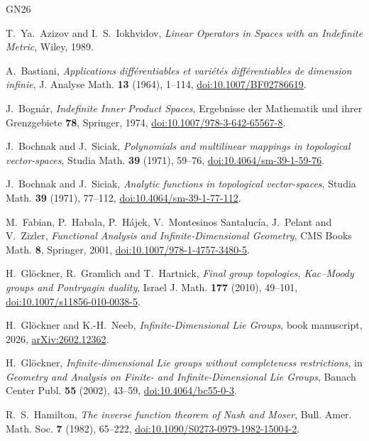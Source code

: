 \begin{thebibliography}{GN26}

T.~Ya.~Azizov and I.~S.~Iokhvidov, \emph{Linear Operators in Spaces with an Indefinite Metric},
Wiley, 1989.

A.~Bastiani, \emph{Applications différentiables et variétés différentiables de dimension
infinie}, J. Analyse Math. \textbf{13} (1964), 1--114, \href{https://doi.org/10.1007/BF02786619}{doi:10.1007/BF02786619}.

J.~Bognár, \emph{Indefinite Inner Product Spaces}, Ergebnisse der Mathematik und ihrer
Grenzgebiete \textbf{78}, Springer, 1974, \href{https://doi.org/10.1007/978-3-642-65567-8}{doi:10.1007/978-3-642-65567-8}.

J.~Bochnak and J.~Siciak, \emph{Polynomials and multilinear mappings in topological
vector-spaces}, Studia Math. \textbf{39} (1971), 59--76, \href{https://doi.org/10.4064/sm-39-1-59-76}{doi:10.4064/sm-39-1-59-76}.

J.~Bochnak and J.~Siciak, \emph{Analytic functions in topological vector-spaces}, Studia Math.
\textbf{39} (1971), 77--112, \href{https://doi.org/10.4064/sm-39-1-77-112}{doi:10.4064/sm-39-1-77-112}.

M.~Fabian, P.~Habala, P.~Hájek, V.~Montesinos Santalucía, J.~Pelant and V.~Zizler,
\emph{Functional Analysis and Infinite-Dimensional Geometry}, CMS Books Math. \textbf{8},
Springer, 2001, \href{https://doi.org/10.1007/978-1-4757-3480-5}{doi:10.1007/978-1-4757-3480-5}.

H.~Glöckner, R.~Gramlich and T.~Hartnick, \emph{Final group topologies, Kac--Moody groups and
Pontryagin duality}, Israel J. Math. \textbf{177} (2010), 49--101, \href{https://doi.org/10.1007/s11856-010-0038-5}{doi:10.1007/s11856-010-0038-5}.

H.~Glöckner and K.-H.~Neeb, \emph{Infinite-Dimensional Lie Groups}, book manuscript, 2026,
\href{https://arxiv.org/abs/2602.12362}{arXiv:2602.12362}.

H.~Glöckner, \emph{Infinite-dimensional Lie groups without completeness restrictions}, in
\emph{Geometry and Analysis on Finite- and Infinite-Dimensional Lie Groups}, Banach Center
Publ. \textbf{55} (2002), 43--59, \href{https://doi.org/10.4064/bc55-0-3}{doi:10.4064/bc55-0-3}.

R.~S.~Hamilton, \emph{The inverse function theorem of Nash and Moser}, Bull. Amer. Math. Soc.
\textbf{7} (1982), 65--222, \href{https://doi.org/10.1090/S0273-0979-1982-15004-2}{doi:10.1090/S0273-0979-1982-15004-2}.


\end{thebibliography}

